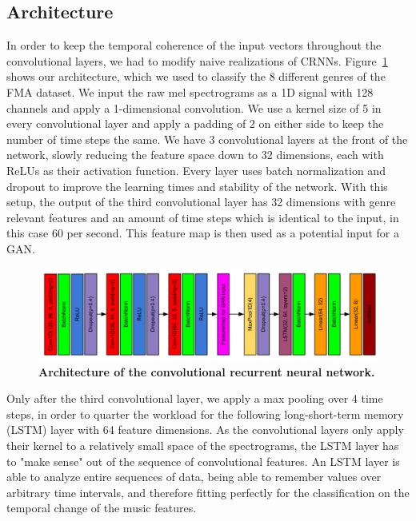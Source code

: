     \subsection{Architecture}
    In order to keep the temporal coherence of the input vectors throughout the convolutional layers, we had to modify naive realizations of CRNNs.
    Figure~\ref{CRNN} shows our architecture, which we used to classify the 8 different genres of the FMA dataset.
    We input the raw mel spectrograms as a 1D signal with 128 channels and apply a 1-dimensional convolution.
    We use a kernel size of 5 in every convolutional layer and apply a padding of 2 on either side to keep the number of time steps the same.
    We have 3 convolutional layers at the front of the network, slowly reducing the feature space down to 32 dimensions, each with ReLUs as their activation function.
    Every layer uses batch normalization and dropout to improve the learning times and stability of the network.
    With this setup, the output of the third convolutional layer has 32 dimensions with genre relevant features and an amount of time steps which is identical to the input, in this case 60 per second.
    This feature map is then used as a potential input for a GAN.\\
    \begin{figure}[t]
        \centering
        \includegraphics[width=\textwidth]{images/CRNNmodel}
        \caption{\textbf{Architecture of the convolutional recurrent neural network.}}
        \label{CRNN}
    \end{figure}
    Only after the third convolutional layer, we apply a max pooling over 4 time steps, in order to quarter the workload for the following long-short-term memory (LSTM) layer with 64 feature dimensions.
    As the convolutional layers only apply their kernel to a relatively small space of the spectrograms, the LSTM layer has to "make sense" out of the sequence of convolutional features.
    An LSTM layer is able to analyze entire sequences of data, being able to remember values over arbitrary time intervals, and therefore fitting perfectly for the classification on the temporal change of the music features.
